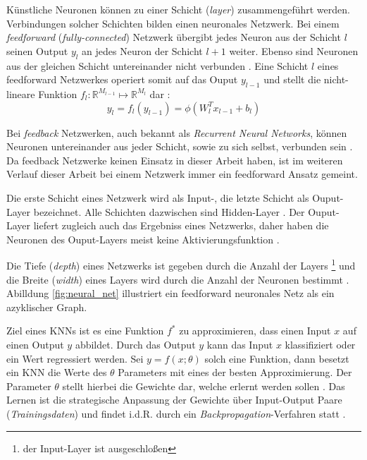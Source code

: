 Künstliche Neuronen können zu einer Schicht (\textit{layer}) zusammengeführt werden. Verbindungen solcher Schichten bilden einen neuronales Netzwerk.
Bei einem \textit{feedforward} (\textit{fully-connected}) Netzwerk übergibt jedes Neuron aus der Schicht $l$ seinen Output $y_{l}$ an jedes Neuron der Schicht $l+1$ weiter. Ebenso sind Neuronen aus der gleichen Schicht untereinander nicht verbunden \cite{Goodfellow-et-al-2016}.
Eine Schicht $l$ eines feedforward Netzwerkes operiert somit auf das Ouput $y_{l-1}$ und stellt die nicht-lineare Funktion $f_l :  \mathbb{R}^{M_{l-1}} \mapsto \mathbb{R}^{M_l}$ dar \cite{bauckhageInformedMachineLearning}:
\begin{equation}
\label{eq:layer}
y_l = f_l(y_{l-1}) = \phi(W^T_lx_{l-1}+b_{l})
\end{equation}

Bei \textit{feedback} Netzwerken, auch bekannt als \textit{Recurrent Neural Networks}, können Neuronen untereinander aus jeder Schicht, sowie zu sich selbst, verbunden sein \cite{Goodfellow-et-al-2016}. Da feedback Netzwerke keinen Einsatz in dieser Arbeit haben, ist im weiteren Verlauf dieser Arbeit bei einem Netzwerk immer ein feedforward Ansatz gemeint.
 
Die erste Schicht eines Netzwerk wird als Input-, die letzte Schicht als Ouput-Layer bezeichnet. Alle Schichten dazwischen sind Hidden-Layer \cite{Goodfellow-et-al-2016}. Der Ouput-Layer liefert zugleich auch das Ergebniss eines Netzwerks, daher haben die Neuronen des Ouput-Layers meist keine Aktivierungsfunktion \cite{CS231nConvolutionalNeural}.

Die Tiefe (\textit{depth}) eines Netzwerks ist gegeben durch die Anzahl der Layers \footnote{der Input-Layer ist ausgeschloßen} und die Breite (\textit{width}) eines Layers wird durch die Anzahl der Neuronen bestimmt \cite{Goodfellow-et-al-2016}. 
Abilldung \ref{fig:neural_net} illustriert ein feedforward neuronales Netz als ein azyklischer Graph.

Ziel eines KNNs ist es eine Funktion $f^*$ zu approximieren, dass einen Input $x$ auf einen Output $y$ abbildet. Durch das Output $y$ kann das Input $x$ klassifiziert oder ein Wert regressiert werden. Sei $y = f(x; \theta)$  solch eine Funktion, dann besetzt ein KNN die Werte des $\theta$ Parameters mit eines der besten Approximierung. Der Parameter $\theta$ stellt hierbei die Gewichte dar, welche erlernt werden sollen \cite{Goodfellow-et-al-2016}. 
Das Lernen ist die strategische Anpassung der Gewichte über Input-Output Paare (\textit{Trainingsdaten}) und findet i.d.R. durch ein \textit{Backpropagation}-Verfahren statt \cite{Goodfellow-et-al-2016}. 


